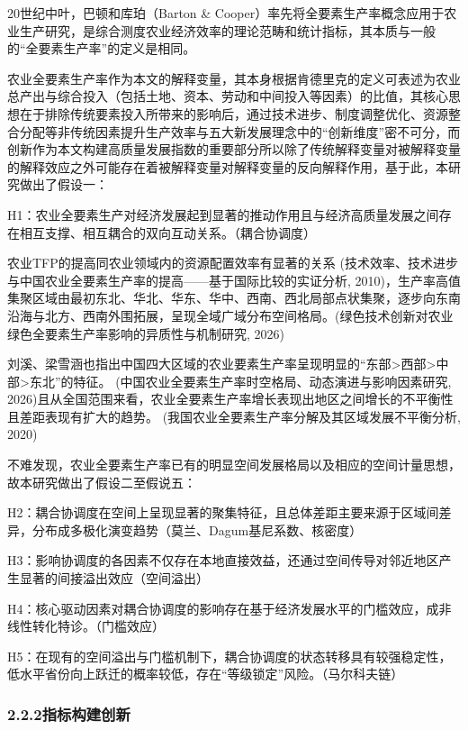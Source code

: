 \documentclass[UTF8,a4paper,12pt,fontset=windows]{ctexart}
\begin{document}
20世纪中叶，巴顿和库珀（Barton \& Cooper）率先将全要素生产率概念应用于农业生产研究，是综合测度农业经济效率的理论范畴和统计指标，其本质与一般的``全要素生产率''的定义是相同。

农业全要素生产率作为本文的解释变量，其本身根据肯德里克的定义可表述为农业总产出与综合投入（包括土地、资本、劳动和中间投入等因素）的比值，其核心思想在于排除传统要素投入所带来的影响后，通过技术进步、制度调整优化、资源整合分配等非传统因素提升生产效率与五大新发展理念中的``创新维度''密不可分，而创新作为本文构建高质量发展指数的重要部分所以除了传统解释变量对被解释变量的解释效应之外可能存在着被解释变量对解释变量的反向解释作用，基于此，本研究做出了假设一：

H1：农业全要素生产对经济发展起到显著的推动作用且与经济高质量发展之间存在相互支撑、相互耦合的双向互动关系。（耦合协调度）

农业TFP的提高同农业领域内的资源配置效率有显著的关系 (技术效率、技术进步与中国农业全要素生产率的提高------基于国际比较的实证分析, 2010)，生产率高值集聚区域由最初东北、华北、华东、华中、西南、西北局部点状集聚，逐步向东南沿海与北方、西南外围拓展，呈现全域广域分布空间格局。(绿色技术创新对农业绿色全要素生产率影响的异质性与机制研究, 2026)

刘溪、梁雪涵也指出中国四大区域的农业要素生产率呈现明显的``东部\textgreater 西部\textgreater 中部\textgreater 东北''的特征。 (中国农业全要素生产率时空格局、动态演进与影响因素研究, 2026)且从全国范围来看，农业全要素生产率增长表现出地区之间增长的不平衡性且差距表现有扩大的趋势。 (我国农业全要素生产率分解及其区域发展不平衡分析, 2020)

不难发现，农业全要素生产率已有的明显空间发展格局以及相应的空间计量思想，故本研究做出了假设二至假说五：

H2：耦合协调度在空间上呈现显著的聚集特征，且总体差距主要来源于区域间差异，分布成多极化演变趋势（莫兰、Dagum基尼系数、核密度）

H3：影响协调度的各因素不仅存在本地直接效益，还通过空间传导对邻近地区产生显著的间接溢出效应（空间溢出）

H4：核心驱动因素对耦合协调度的影响存在基于经济发展水平的门槛效应，成非线性转化特诊。（门槛效应）

H5：在现有的空间溢出与门槛机制下，耦合协调度的状态转移具有较强稳定性，低水平省份向上跃迁的概率较低，存在``等级锁定''风险。（马尔科夫链）

\subsubsection{2.2.2指标构建创新}\label{ux6307ux6807ux6784ux5efaux521bux65b0}
\end{document}
